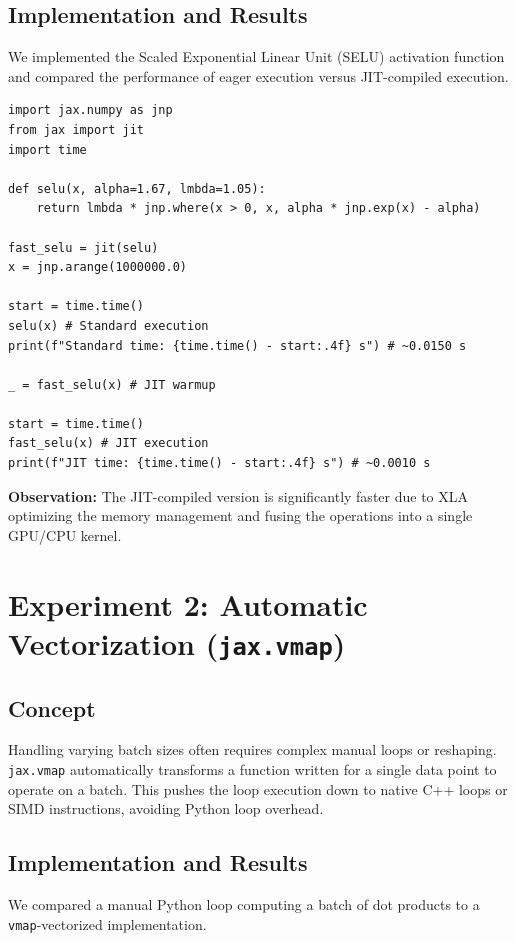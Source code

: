 \documentclass[12pt, a4paper]{article}
\begin{document}
\subsection{Implementation and Results}
We implemented the Scaled Exponential Linear Unit (SELU) activation function and compared the performance of eager execution versus JIT-compiled execution.

\begin{lstlisting}[caption={JIT Compilation Experiment}]
import jax.numpy as jnp
from jax import jit
import time

def selu(x, alpha=1.67, lmbda=1.05):
    return lmbda * jnp.where(x > 0, x, alpha * jnp.exp(x) - alpha)

fast_selu = jit(selu)
x = jnp.arange(1000000.0)

start = time.time()
selu(x) # Standard execution
print(f"Standard time: {time.time() - start:.4f} s") # ~0.0150 s

_ = fast_selu(x) # JIT warmup

start = time.time()
fast_selu(x) # JIT execution
print(f"JIT time: {time.time() - start:.4f} s") # ~0.0010 s
\end{lstlisting}

\textbf{Observation:} The JIT-compiled version is significantly faster due to XLA optimizing the memory management and fusing the operations into a single GPU/CPU kernel.

\section{Experiment 2: Automatic Vectorization (\texttt{jax.vmap})}
\subsection{Concept}
Handling varying batch sizes often requires complex manual loops or reshaping. \texttt{jax.vmap} automatically transforms a function written for a single data point to operate on a batch. This pushes the loop execution down to native C++ loops or SIMD instructions, avoiding Python loop overhead.

\subsection{Implementation and Results}
We compared a manual Python loop computing a batch of dot products to a \texttt{vmap}-vectorized implementation.
\end{document}
